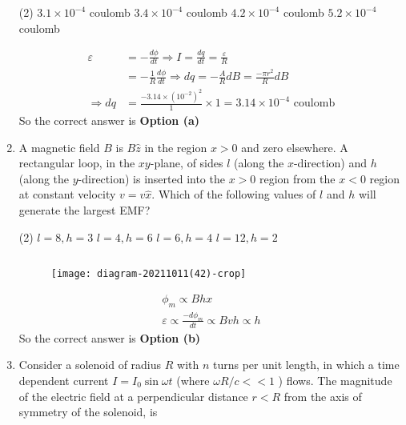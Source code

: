 \begin{enumerate}
	{}
	\begin{tasks}(2)
		\task[\textbf{a.}] $3.1 \times 10^{-4}$ coulomb
		\task[\textbf{b.}]$3.4 \times 10^{-4}$ coulomb
		\task[\textbf{c.}]$4.2 \times 10^{-4}$ coulomb
		\task[\textbf{d.}] $5.2 \times 10^{-4}$ coulomb
	\end{tasks}	
\begin{answer}
	\begin{align*}
	\varepsilon&=-\frac{d \phi}{d t} \Rightarrow I=\frac{d q}{d t}=\frac{\varepsilon}{R}\\&=-\frac{1}{R} \frac{d \phi}{d t} \Rightarrow d q=-\frac{A}{R} d B=\frac{-\pi r^{2}}{R} d B\\
	\Rightarrow d q&=\frac{-3.14 \times\left(10^{-2}\right)^{2}}{1} \times 1=3.14 \times 10^{-4}\text{ coulomb}
	\end{align*}
	So the correct answer is \textbf{Option (a)}
\end{answer}
	\item A magnetic field $B$ is $B \hat{z}$ in the region $x>0$ and zero elsewhere. A rectangular loop, in the $x y$-plane, of sides $l$ (along the $x$-direction) and $h$ (along the $y$-direction) is inserted into the $x>0$ region from the $x<0$ region at constant velocity $v=v \hat{x}$. Which of the following values of $l$ and $h$ will generate the largest EMF?
	{}
	\begin{tasks}(2)
		\task[\textbf{a.}] $l=8, h=3$
		\task[\textbf{b.}]$l=4, h=6$
		\task[\textbf{c.}]$l=6, h=4$
		\task[\textbf{d.}]  $l=12, h=2$
	\end{tasks}	
\begin{answer}$\left. \right. $
	\begin{figure}[H]
		\centering
		\texttt{[image: diagram-20211011(42)-crop]}
	\end{figure}
	\begin{align*}
	\phi_{m} \propto B h x\\
	\varepsilon \propto \frac{-d \phi_{m}}{d t} \propto B v h \propto h
	\end{align*}
	So the correct answer is \textbf{Option (b)}
\end{answer}
	\item Consider a solenoid of radius $R$ with $n$ turns per unit length, in which a time dependent current $I=I_{0} \sin \omega t$ (where $\omega R / c<<1$ ) flows. The magnitude of the electric field at a perpendicular distance $r<R$ from the axis of symmetry of the solenoid, is
	{}

\end{enumerate}
